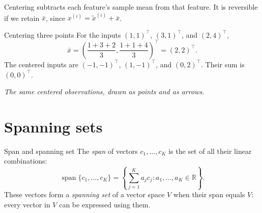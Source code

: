 \documentclass[a4paper,12pt,oneside]{report}
\begin{document}
Centering subtracts each feature's sample mean from that feature. It is
reversible if we retain $\bar{x}$, since
$x^{(i)}=\widetilde{x}^{(i)}+\bar{x}$.

\begin{framedexample}{Centering three points}
For the inputs $(1,1)^\top$, $(3,1)^\top$, and $(2,4)^\top$,
\[
  \bar{x}=\left(\frac{1+3+2}{3},\frac{1+1+4}{3}\right)^\top
         =(2,2)^\top.
\]
The centered inputs are $(-1,-1)^\top$, $(1,-1)^\top$, and
$(0,2)^\top$. Their sum is $(0,0)^\top$.
\end{framedexample}

\begin{center}
\par\smallskip
{\small\textit{The same centered observations, drawn as points and as arrows.}}
\end{center}

\clearpage
\section{Spanning sets}

\begin{frameddefn}{Span and spanning set}\label{def:span}
The \emph{span} of vectors $c_1,\ldots,c_K$ is the set of all their
linear combinations:
\[
  \operatorname{span}\{c_1,\ldots,c_K\}
  =\left\{\sum_{j=1}^{K}a_jc_j:a_1,\ldots,a_K\in\mathbb{R}\right\}.
\]
These vectors form a \emph{spanning set} of a vector space $V$ when
their span equals $V$: every vector in $V$ can be expressed using them.
\end{frameddefn}
\end{document}
